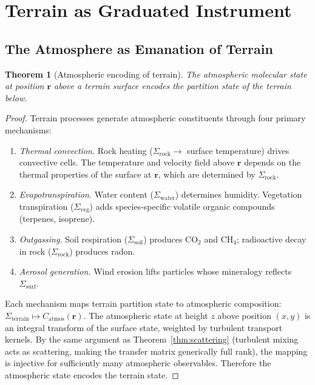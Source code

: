 \documentclass[10pt,twocolumn]{article}
\newtheorem{theorem}{Theorem}[section]
\theoremstyle{definition}
\theoremstyle{remark}
\begin{document}
\section{Terrain as Graduated Instrument}
\label{sec:graduated}

\subsection{The Atmosphere as Emanation of Terrain}
\label{sec:atmosphere}

\begin{theorem}[Atmospheric encoding of terrain]
\label{thm:atmos}
The atmospheric molecular state at position $\mathbf{r}$ above
a terrain surface encodes the partition state of the terrain
below.
\end{theorem}

\begin{proof}
Terrain processes generate atmospheric constituents through
four primary mechanisms:
\begin{enumerate}[leftmargin=*,itemsep=2pt]
\item \emph{Thermal convection.}  Rock heating
  ($\Sigma_{\mathrm{rock}}\to$ surface temperature) drives
  convective cells.  The temperature and velocity field
  above $\mathbf{r}$ depends on the thermal properties of
  the surface at $\mathbf{r}$, which are determined by
  $\Sigma_{\mathrm{rock}}$.
\item \emph{Evapotranspiration.}  Water content
  ($\Sigma_{\mathrm{water}}$) determines humidity.  Vegetation
  transpiration ($\Sigma_{\mathrm{veg}}$) adds species-specific
  volatile organic compounds (terpenes, isoprene).
\item \emph{Outgassing.}  Soil respiration
  ($\Sigma_{\mathrm{soil}}$) produces CO$_2$ and CH$_4$;
  radioactive decay in rock ($\Sigma_{\mathrm{rock}}$) produces
  radon.
\item \emph{Aerosol generation.}  Wind erosion lifts particles
  whose mineralogy reflects $\Sigma_{\mathrm{surf}}$.
\end{enumerate}

Each mechanism maps terrain partition state to atmospheric
composition: $\Sigma_{\mathrm{terrain}}\mapsto
C_{\mathrm{atmos}}(\mathbf{r})$.  The atmospheric state at
height $z$ above position $(x,y)$ is an integral transform of
the surface state, weighted by turbulent transport kernels.
By the same argument as Theorem~\ref{thm:scattering}
(turbulent mixing acts as scattering, making the transfer
matrix generically full rank), the mapping is injective for
sufficiently many atmospheric observables.  Therefore the
atmospheric state encodes the terrain state.
\end{proof}
\end{document}
